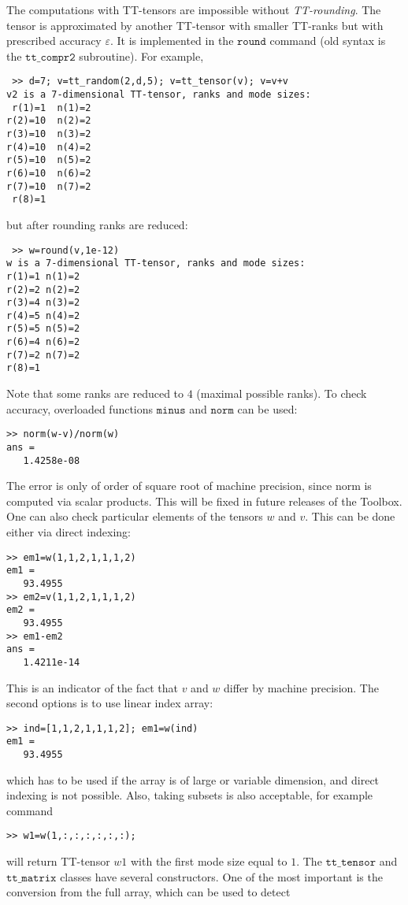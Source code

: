 \documentclass[a4paper,12pt,twoside]{article}
\def\tt{\texttt{tt\_tensor}}
\def\ttm{\texttt{tt\_matrix}}
\begin{document}
The computations with TT-tensors are impossible without \emph{TT-rounding}. The tensor
is approximated by another TT-tensor with smaller TT-ranks but with prescribed accuracy $\varepsilon$.
It is implemented in the $\texttt{round}$ command (old syntax is the $\texttt{tt\_compr2}$ subroutine). 
For example, 
\begin{lstlisting}
 >> d=7; v=tt_random(2,d,5); v=tt_tensor(v); v=v+v
v2 is a 7-dimensional TT-tensor, ranks and mode sizes: 
 r(1)=1  n(1)=2
r(2)=10  n(2)=2
r(3)=10  n(3)=2
r(4)=10  n(4)=2
r(5)=10  n(5)=2
r(6)=10  n(6)=2
r(7)=10  n(7)=2
 r(8)=1        
\end{lstlisting}
but after rounding ranks are reduced:
\begin{lstlisting}
 >> w=round(v,1e-12)
w is a 7-dimensional TT-tensor, ranks and mode sizes: 
r(1)=1 n(1)=2
r(2)=2 n(2)=2
r(3)=4 n(3)=2
r(4)=5 n(4)=2
r(5)=5 n(5)=2
r(6)=4 n(6)=2
r(7)=2 n(7)=2
r(8)=1       
\end{lstlisting}
Note that some ranks are reduced to $4$ (maximal possible ranks).
To check accuracy, overloaded functions $\texttt{minus}$ and $\texttt{norm}$ can be used:
\begin{lstlisting}
>> norm(w-v)/norm(w)
ans =
   1.4258e-08
\end{lstlisting}
The error is only of order of square root of machine precision, since norm is computed via
scalar products. This will be fixed in future releases of the Toolbox. One can also check
particular elements of the tensors $w$ and $v$. This can be done either via direct indexing:
\begin{lstlisting}
>> em1=w(1,1,2,1,1,1,2)
em1 =
   93.4955
>> em2=v(1,1,2,1,1,1,2)
em2 =
   93.4955
>> em1-em2
ans = 
   1.4211e-14
\end{lstlisting}
This is an indicator of the fact that $v$ and $w$ differ by machine precision. 
The second options is to use linear index array:
\begin{lstlisting}
>> ind=[1,1,2,1,1,1,2]; em1=w(ind)
em1 =
   93.4955
\end{lstlisting}
which has to be used if the array is of large or variable dimension, and direct indexing is not possible.
Also, taking subsets is also acceptable, for example command
\begin{lstlisting}
>> w1=w(1,:,:,:,:,:,:);
\end{lstlisting}
 will return TT-tensor $w1$ with the first mode size equal to $1$.
The $\tt$ and $\ttm$ classes have several constructors. One of the most important
is the conversion from the full array, which can be used to detect 
\end{document}
